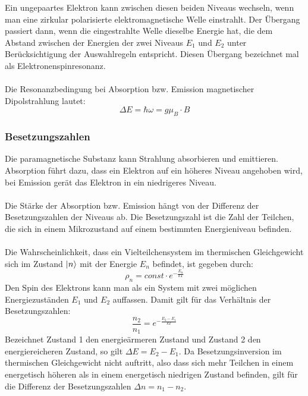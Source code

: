 \documentclass[a4paper,titlepage]{scrartcl}
\numberwithin{equation}{section}
\begin{document}
Ein ungepaartes Elektron kann zwischen diesen beiden Niveaus wechseln, wenn man eine zirkular polarisierte elektromagnetische Welle einstrahlt. Der Übergang passiert dann, wenn die eingestrahlte Welle dieselbe Energie hat, die dem Abstand zwischen der Energien der zwei Niveaus $E_1$ und $E_2$ unter Berücksichtigung der Auswahlregeln entspricht. Diesen Übergang bezeichnet mal als Elektronenspinresonanz.\cite{mappe}\\ \\
Die Resonanzbedingung bei Absorption bzw. Emission magnetischer Dipolstrahlung lautet:
\begin{equation}
\Delta E=\hbar \omega=g \mu_B \cdot B
\label{eq:resonanzBedingung}
\end{equation}
\subsubsection{Besetzungszahlen}
Die paramagnetische Substanz kann Strahlung absorbieren und emittieren. Absorption führt dazu, dass ein Elektron auf ein höheres Niveau angehoben wird, bei Emission gerät das Elektron in ein niedrigeres Niveau.\\ \\
Die Stärke der Absorption bzw. Emission hängt von der Differenz der Besetzungszahlen der Niveaus ab. Die Besetzungszahl ist die Zahl der Teilchen, die sich in einem Mikrozustand auf einem bestimmten Energieniveau befinden.\\ \\
Die Wahrscheinlichkeit, dass ein Vielteilchensystem im thermischen Gleichgewicht sich im Zustand $\ket{n}$ mit der Energie $E_n$ befindet, ist gegeben durch:
\begin{equation*}
\rho_n=const \cdot e^{-\frac{E_n}{kT}}
\end{equation*}
Den Spin des Elektrons kann man als ein System mit zwei möglichen Energiezuständen $E_1$ und $E_2$ auffassen. Damit gilt für das Verhältnis der Besetzungszahlen:
\begin{equation*}
\frac{n_2}{n_1}=e^{-\frac{E_2-E_1}{kT}}
\end{equation*}
Bezeichnet Zustand 1 den energieärmeren Zustand und Zustand 2 den energiereicheren Zustand, so gilt $\Delta E=E_2-E_1$. Da Besetzungsinversion im thermischen Gleichgewicht nicht auftritt, also dass sich mehr Teilchen in einem energetisch höheren als in einem energetisch niedrigen Zustand befinden, gilt für die Differenz der Besetzungszahlen $\Delta n=n_1-n_2$.\\ \\
\end{document}
